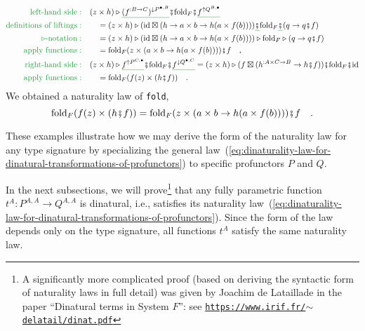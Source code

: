 \begin{align*}
{\color{greenunder}\text{left-hand side}:}\quad & (z\times h)\triangleright\gunderline{(f^{:B\rightarrow C})^{\downarrow P^{\bullet,B}}}\bef\text{fold}_{F}\bef\gunderline{f^{\uparrow Q^{B,\bullet}}}\\
{\color{greenunder}\text{definitions of liftings}:}\quad & \quad=(z\times h)\triangleright(\text{id}\boxtimes(h\rightarrow a\times b\rightarrow h(a\times f(b))))\gunderline{\bef}\text{fold}_{F}\gunderline{\bef}(q\rightarrow q\bef f)\\
{\color{greenunder}\triangleright\text{-notation}:}\quad & \quad=(z\times h)\triangleright(\text{id}\boxtimes(h\rightarrow a\times b\rightarrow h(a\times f(b))))\triangleright\text{fold}_{F}\triangleright(q\rightarrow q\bef f)\\
{\color{greenunder}\text{apply functions}:}\quad & \quad=\text{fold}_{F}(z\times(a\times b\rightarrow h(a\times f(b))))\bef f\quad,\\
{\color{greenunder}\text{right-hand side}:}\quad & (z\times h)\triangleright\gunderline{f^{\uparrow P^{C,\bullet}}}\bef\text{fold}_{F}\bef\gunderline{f^{\downarrow Q^{\bullet,C}}}=(z\times h)\triangleright(f\boxtimes(h^{:A\times C\rightarrow B}\rightarrow h\bef f))\bef\text{fold}_{F}\bef\text{id}\\
{\color{greenunder}\text{apply functions}:}\quad & \quad=\text{fold}_{F}(f(z)\times(h\bef f))\quad.
\end{align*}
We obtained a naturality law of \lstinline!fold!,
\[
\text{fold}_{F}(f(z)\times(h\bef f))=\text{fold}_{F}(z\times(a\times b\rightarrow h(a\times f(b))))\bef f\quad.
\]

These examples illustrate how we may derive the form of the naturality
law for any type signature by specializing the general law~(\ref{eq:dinaturality-law-for-dinatural-transformations-of-profunctors})
to specific profunctors $P$ and $Q$.

In the next subsections, we will prove\footnote{A significantly more complicated proof (based on deriving the syntactic
form of naturality laws in full detail) was given by Joachim de Lataillade
in the paper \textsf{``}Dinatural terms in System $F$\textsf{''}: see \texttt{\href{https://www.irif.fr/~delatail/dinat.pdf}{https://www.irif.fr/$\sim$delatail/dinat.pdf}}} that any fully parametric function $t^{A}:P^{A,A}\rightarrow Q^{A,A}$
is dinatural, i.e., satisfies its naturality law~(\ref{eq:dinaturality-law-for-dinatural-transformations-of-profunctors}).
Since the form of the law depends only on the type signature, all
functions $t^{A}$ satisfy the same naturality law.

